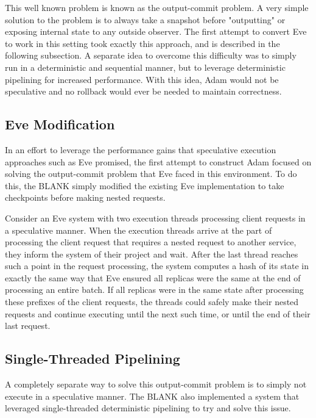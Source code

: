 \documentclass[11pt, oneside]{report}
\begin{document}
This well known problem is known as the output-commit problem. A very simple solution to the problem is to always take a snapshot before "outputting" or exposing internal state to any outside observer. The first attempt to convert Eve to work in this setting took exactly this approach, and is described in the following subsection. A separate idea to overcome this difficulty was to simply run in a deterministic and sequential manner, but to leverage deterministic pipelining for increased performance. With this idea, Adam would not be speculative and no rollback would ever be needed to maintain correctness.

\subsection{Eve Modification}

In an effort to leverage the performance gains that speculative execution approaches such as Eve promised, the first attempt to construct Adam focused on solving the output-commit problem that Eve faced in this environment. To do this, the 
BLANK %
simply modified the existing Eve implementation to take checkpoints before making nested requests. 


Consider an Eve system with two execution threads processing client requests in a speculative manner. When the execution threads arrive at the part of processing the client request that requires a nested request to another service, they inform the system of their project and wait. After the last thread reaches such a point in the request processing, the system computes a hash of its state in exactly the same way that Eve ensured all replicas were the same at the end of processing an entire batch. If all replicas were in the same state after processing these prefixes of the client requests, the threads could safely make their nested requests and continue executing until the next such time, or until the end of their last request.

\subsection{Single-Threaded Pipelining}

A completely separate way to solve this output-commit problem is to simply not execute in a speculative manner. The
BLANK %
also implemented a system that leveraged single-threaded deterministic pipelining to try and solve this issue.
\end{document}
